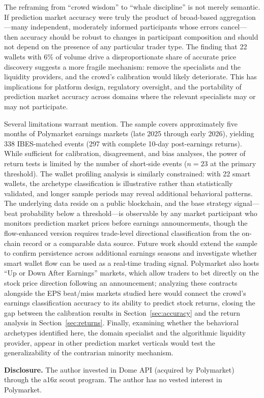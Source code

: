\documentclass[11pt]{article}
\begin{document}
The reframing from ``crowd wisdom'' to ``whale discipline'' is not merely semantic. If prediction market accuracy were truly the product of broad-based aggregation---many independent, moderately informed participants whose errors cancel---then accuracy should be robust to changes in participant composition and should not depend on the presence of any particular trader type. The finding that 22 wallets with 6\% of volume drive a disproportionate share of accurate price discovery suggests a more fragile mechanism: remove the specialists and the liquidity providers, and the crowd's calibration would likely deteriorate. This has implications for platform design, regulatory oversight, and the portability of prediction market accuracy across domains where the relevant specialists may or may not participate.

Several limitations warrant mention. The sample covers approximately five months of Polymarket earnings markets (late 2025 through early 2026), yielding 338 IBES-matched events (297 with complete 10-day post-earnings returns). While sufficient for calibration, disagreement, and bias analyses, the power of return tests is limited by the number of short-side events ($n = 23$ at the primary threshold). The wallet profiling analysis is similarly constrained: with 22 smart wallets, the archetype classification is illustrative rather than statistically validated, and longer sample periods may reveal additional behavioral patterns. The underlying data reside on a public blockchain, and the base strategy signal---beat probability below a threshold---is observable by any market participant who monitors prediction market prices before earnings announcements, though the flow-enhanced version requires trade-level directional classification from the on-chain record or a comparable data source. Future work should extend the sample to confirm persistence across additional earnings seasons and investigate whether smart wallet flow can be used as a real-time trading signal. Polymarket also hosts ``Up or Down After Earnings'' markets, which allow traders to bet directly on the stock price direction following an announcement; analyzing these contracts alongside the EPS beat/miss markets studied here would connect the crowd's earnings classification accuracy to its ability to predict stock returns, closing the gap between the calibration results in Section~\ref{sec:accuracy} and the return analysis in Section~\ref{sec:returns}. Finally, examining whether the behavioral archetypes identified here, the domain specialist and the algorithmic liquidity provider, appear in other prediction market verticals would test the generalizability of the contrarian minority mechanism.

\bigskip

\noindent\textbf{Disclosure.} The author invested in Dome API (acquired by Polymarket) through the a16z scout program. The author has no vested interest in Polymarket.

\newpage


\end{document}
